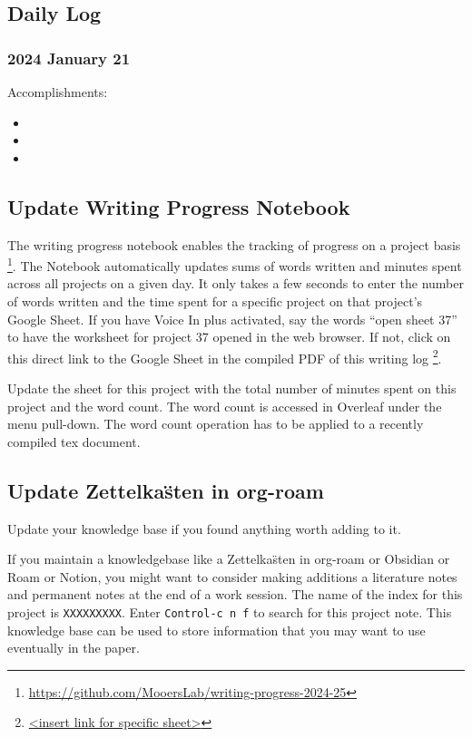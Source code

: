 \documentclass[10pt,letterpaper]{article}
\newcommand{\bi}{\begin{itemize}}
\newcommand{\ei}{\end{itemize}}
\begin{document}

\subsection{Daily Log}
\label{sub:daily-log}


\subsubsection{2024 January 21}

Accomplishments:
\bi
\item 
\item
\item
\ei



\subsection{Update Writing Progress Notebook}
\label{sub:WPsheet}
The writing progress notebook enables the tracking of progress on a project basis \footnote{\url{https://github.com/MooersLab/writing-progress-2024-25}}.
The Notebook automatically updates sums of words written and minutes spent across all projects on a given day.
It only takes a few seconds to enter the number of words written and the time spent for a specific project on that project's Google Sheet. 
If you have Voice In plus activated, say the words ``open sheet 37'' to have the worksheet for project 37 opened in the web browser.
If not, click on this direct link to the Google Sheet in the compiled PDF of this writing log \footnote{\url{<insert link for specific sheet>}}.

Update the sheet for this project with the total number of minutes spent on this project and the word count.
The word count is accessed in Overleaf under the menu pull-down.
The word count operation has to be applied to a recently compiled tex document.






\subsection{Update Zettelka\"sten in org-roam}
\label{sub:zk}
Update your knowledge base if you found anything worth adding to it.

If you maintain a knowledgebase like a Zettelka\"sten in org-roam or Obsidian or Roam or Notion, you might want to consider making additions a literature notes and permanent notes at the end of a work session.
The name of the index for this project is \verb|XXXXXXXXX|.
Enter \texttt{Control-c n f} to search for this project note.
This knowledge base can be used to store information that you may want to use eventually in the paper.
\end{document}
